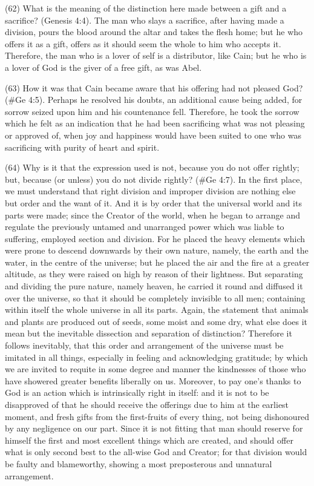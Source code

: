 (62) What is the meaning of the distinction here made between a gift and a sacrifice? (Genesis
4:4). The man who slays a sacrifice, after having made a division, pours the blood around the altar
and takes the flesh home; but he who offers it as a gift, offers as it should seem the whole to him
who accepts it. Therefore, the man who is a lover of self is a distributor, like Cain; but he who is a
lover of God is the giver of a free gift, as was Abel.

(63) How it was that Cain became aware that his offering had not pleased God? (\#Ge 4:5).
Perhaps he resolved his doubts, an additional cause being added, for sorrow seized upon him and
his countenance fell. Therefore, he took the sorrow which he felt as an indication that he had been
sacrificing what was not pleasing or approved of, when joy and happiness would have been suited
to one who was sacrificing with purity of heart and spirit.

(64) Why is it that the expression used is not, because you do not offer rightly; but, because (or
unless) you do not divide rightly? (\#Ge 4:7). In the first place, we must understand that right
division and improper division are nothing else but order and the want of it. And it is by order that
the universal world and its parts were made; since the Creator of the world, when he began to
arrange and regulate the previously untamed and unarranged power which was liable to suffering,
employed section and division. For he placed the heavy elements which were prone to descend
downwards by their own nature, namely, the earth and the water, in the centre of the universe; but
he placed the air and the fire at a greater altitude, as they were raised on high by reason of their
lightness. But separating and dividing the pure nature, namely heaven, he carried it round and
diffused it over the universe, so that it should be completely invisible to all men; containing within
itself the whole universe in all its parts. Again, the statement that animals and plants are produced
out of seeds, some moist and some dry, what else does it mean but the inevitable dissection and
separation of distinction? Therefore it follows inevitably, that this order and arrangement of the
universe must be imitated in all things, especially in feeling and acknowledging gratitude; by which
we are invited to requite in some degree and manner the kindnesses of those who have showered
greater benefits liberally on us. Moreover, to pay one's thanks to God is an action which is
intrinsically right in itself: and it is not to be disapproved of that he should receive the offerings due
to him at the earliest moment, and fresh gifts from the first-fruits of every thing, not being
dishonoured by any negligence on our part. Since it is not fitting that man should reserve for
himself the first and most excellent things which are created, and should offer what is only second
best to the all-wise God and Creator; for that division would be faulty and blameworthy, showing a
most preposterous and unnatural arrangement.

